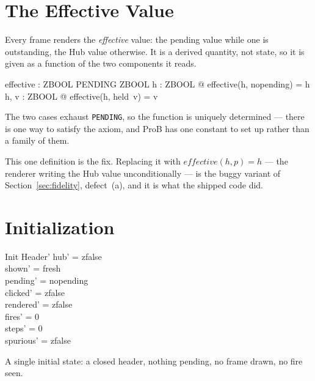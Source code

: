 \documentclass[a4paper,10pt,fleqn]{article}
\begin{document}
\section{The Effective Value}

Every frame renders the \emph{effective} value: the pending value while one is
outstanding, the Hub value otherwise.  It is a derived quantity, not state, so
it is given as a function of the two components it reads.

\begin{axdef}
  effective : ZBOOL \cross PENDING \fun ZBOOL
\where
  \forall h : ZBOOL @ effective(h, nopending) = h \\
  \forall h, v : ZBOOL @ effective(h, held~v) = v
\end{axdef}

The two cases exhaust \texttt{PENDING}, so the function is uniquely determined
--- there is one way to satisfy the axiom, and ProB has one constant to set up
rather than a family of them.

This one definition is the fix.  Replacing it with $effective(h, p) = h$ ---
the renderer writing the Hub value unconditionally --- is the buggy variant of
Section~\ref{sec:fidelity}, defect~(a), and it is what the shipped code did.

\section{Initialization}

\begin{schema}{Init}
  Header'
\where
  hub' = zfalse \\
  shown' = fresh \\
  pending' = nopending \\
  clicked' = zfalse \\
  rendered' = zfalse \\
  fires' = 0 \\
  steps' = 0 \\
  spurious' = zfalse
\end{schema}

A single initial state: a closed header, nothing pending, no frame drawn, no
fire seen.

\end{document}
